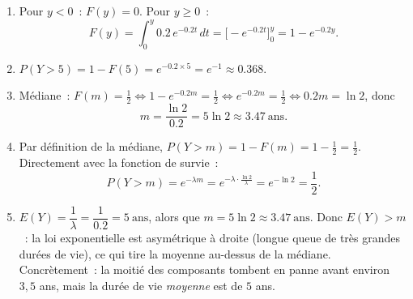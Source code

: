 \documentclass[11pt]{article}
\begin{document}
\begin{corrige}[Exercice 6 — Temps d'attente exponentiel ($\lambda=0.2$)]
\begin{enumerate}
\item Pour $y < 0$~: $F(y) = 0$. Pour $y \geq 0$~:
\[ F(y) = \int_0^y 0.2\,e^{-0.2t}\,dt = \Big[-e^{-0.2t}\Big]_0^y = 1 - e^{-0.2y}. \]
\item $\displaystyle P(Y > 5) = 1 - F(5) = e^{-0.2 \times 5} = e^{-1} \approx 0.368.$
\item Médiane~: $F(m) = \tfrac12 \Leftrightarrow 1 - e^{-0.2m} = \tfrac12 \Leftrightarrow e^{-0.2m} = \tfrac12 \Leftrightarrow 0.2m = \ln 2$, donc
\[ m = \frac{\ln 2}{0.2} = 5\ln 2 \approx 3.47\ \mathrm{ans}. \]
\item Par définition de la médiane, $P(Y > m) = 1 - F(m) = 1 - \tfrac12 = \tfrac12$. Directement avec la fonction de survie~:
\[ P(Y > m) = e^{-\lambda m} = e^{-\lambda \cdot \frac{\ln 2}{\lambda}} = e^{-\ln 2} = \frac{1}{2}. \]
\item $E(Y) = \dfrac{1}{\lambda} = \dfrac{1}{0.2} = 5\ \mathrm{ans}$, alors que $m = 5\ln 2 \approx 3.47\ \mathrm{ans}$. Donc $E(Y) > m$~: la loi exponentielle est asymétrique à droite (longue queue de très grandes durées de vie), ce qui tire la moyenne au-dessus de la médiane. Concrètement~: la moitié des composants tombent en panne avant environ $3,5$ ans, mais la durée de vie \emph{moyenne} est de $5$ ans.
\end{enumerate}
\end{corrige}
\end{document}
